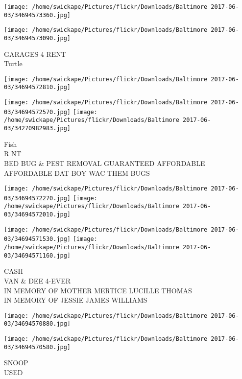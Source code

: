 \documentclass[10pt,letterpaper]{article}
\begin{document}
\texttt{[image: /home/swickape/Pictures/flickr/Downloads/Baltimore 2017-06-03/34694573360.jpg]}

\vspace{0.25in}
\texttt{[image: /home/swickape/Pictures/flickr/Downloads/Baltimore 2017-06-03/34694573090.jpg]}

GARAGES 4 RENT\\
Turtle\\
\pagebreak

\texttt{[image: /home/swickape/Pictures/flickr/Downloads/Baltimore 2017-06-03/34694572810.jpg]}

\vspace{0.25in}
\texttt{[image: /home/swickape/Pictures/flickr/Downloads/Baltimore 2017-06-03/34694572570.jpg]}
\texttt{[image: /home/swickape/Pictures/flickr/Downloads/Baltimore 2017-06-03/34270982983.jpg]}

Fish\\
R NT\\
BED BUG \& PEST REMOVAL GUARANTEED AFFORDABLE AFFORDABLE DAT BOY WAC THEM BUGS\\
\pagebreak

\texttt{[image: /home/swickape/Pictures/flickr/Downloads/Baltimore 2017-06-03/34694572270.jpg]}
\texttt{[image: /home/swickape/Pictures/flickr/Downloads/Baltimore 2017-06-03/34694572010.jpg]}

\texttt{[image: /home/swickape/Pictures/flickr/Downloads/Baltimore 2017-06-03/34694571530.jpg]}
\texttt{[image: /home/swickape/Pictures/flickr/Downloads/Baltimore 2017-06-03/34694571160.jpg]}

CASH\\
VAN \& DEE 4{-}EVER\\
IN MEMORY OF MOTHER MERTICE LUCILLE THOMAS\\
IN MEMORY OF JESSIE JAMES WILLIAMS\\
\pagebreak

\texttt{[image: /home/swickape/Pictures/flickr/Downloads/Baltimore 2017-06-03/34694570880.jpg]}

\vspace{0.25in}
\texttt{[image: /home/swickape/Pictures/flickr/Downloads/Baltimore 2017-06-03/34694570580.jpg]}

SNOOP\\
USED\\
\pagebreak
\end{document}
